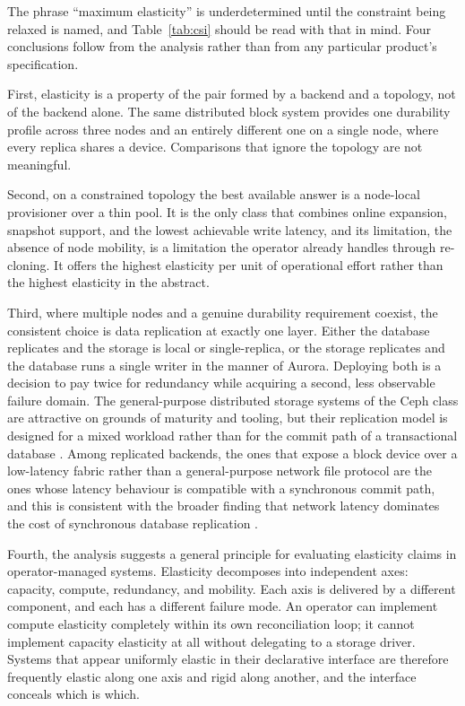 \documentclass[11pt,a4paper]{article}
\begin{document}
The phrase ``maximum elasticity'' is underdetermined until the constraint being relaxed is named, and Table~\ref{tab:csi} should be read with that in mind. Four conclusions follow from the analysis rather than from any particular product's specification.

First, elasticity is a property of the pair formed by a backend and a topology, not of the backend alone. The same distributed block system provides one durability profile across three nodes and an entirely different one on a single node, where every replica shares a device. Comparisons that ignore the topology are not meaningful.

Second, on a constrained topology the best available answer is a node-local provisioner over a thin pool. It is the only class that combines online expansion, snapshot support, and the lowest achievable write latency, and its limitation, the absence of node mobility, is a limitation the operator already handles through re-cloning. It offers the highest elasticity per unit of operational effort rather than the highest elasticity in the abstract.

Third, where multiple nodes and a genuine durability requirement coexist, the consistent choice is data replication at exactly one layer. Either the database replicates and the storage is local or single-replica, or the storage replicates and the database runs a single writer in the manner of Aurora. Deploying both is a decision to pay twice for redundancy while acquiring a second, less observable failure domain. The general-purpose distributed storage systems of the Ceph class are attractive on grounds of maturity and tooling, but their replication model is designed for a mixed workload rather than for the commit path of a transactional database \cite{weil-ceph}. Among replicated backends, the ones that expose a block device over a low-latency fabric rather than a general-purpose network file protocol are the ones whose latency behaviour is compatible with a synchronous commit path, and this is consistent with the broader finding that network latency dominates the cost of synchronous database replication \cite{zamanian-rdma}.

Fourth, the analysis suggests a general principle for evaluating elasticity claims in operator-managed systems. Elasticity decomposes into independent axes: capacity, compute, redundancy, and mobility. Each axis is delivered by a different component, and each has a different failure mode. An operator can implement compute elasticity completely within its own reconciliation loop; it cannot implement capacity elasticity at all without delegating to a storage driver. Systems that appear uniformly elastic in their declarative interface are therefore frequently elastic along one axis and rigid along another, and the interface conceals which is which.
\end{document}
